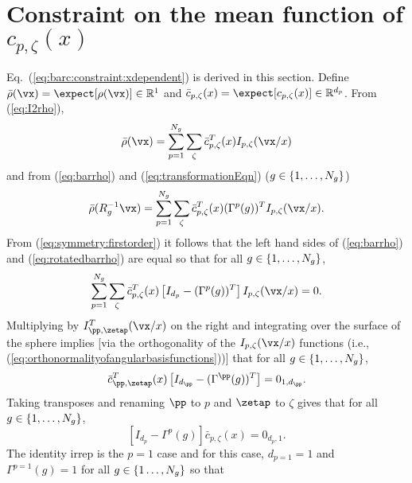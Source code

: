 \section{Constraint on the mean function of $c_{p,\zeta}(x)$}
\label{sec:mean:derivation}
Eq.~(\ref{eq:barc:constraint:xdependent}) is derived in this section.
Define $\bar\rho(\vx)=\expect[\rho(\vx)]\in\mathbb{R}^1$ and
$\bar c_{p,\zeta}(x)=\expect[c_{p,\zeta}(x)]\in\mathbb{R}^{d_p}$.
From (\ref{eq:I2rho}), %
\begin{equation}
\bar\rho(\vx)
=
\sum_{p=1}^{\Ngroup}
\sum_\zeta
\bar c_{p,\zeta}^T(x)
I_{p,\zeta}(\vx/x)
\label{eq:barrho}
\end{equation}
and from
(\ref{eq:barrho}) and (\ref{eq:transformationEqn})
($g\in\{1,\dots,N_g\}$)
\begin{equation}
\bar\rho(R_g^{-1} \vx)
=
\sum_{p=1}^{\Ngroup}
\sum_\zeta
\bar c_{p,\zeta}^T(x)
(\Gamma^p(g))^T
I_{p,\zeta}(\vx/x)
\label{eq:rotatedbarrho}
.
\end{equation}
From (\ref{eq:symmetry:firstorder}) %
it follows that the left hand sides
of
(\ref{eq:barrho}) and (\ref{eq:rotatedbarrho})
are equal so that for
all $g\in\{1,\dots,N_g\}$,
\begin{equation}
\sum_{p=1}^{\Ngroup}
\sum_\zeta
\bar c_{p,\zeta}^T(x)
\left[
I_{d_p}
-
(\Gamma^p(g))^T
\right]
I_{p,\zeta}(\vx/x)
=
0
\label{eq:barc:intermediateresult}
.
\end{equation}
Multiplying by $I_{\pp,\zetap}^T(\vx/x)$ on the right and integrating over the surface of
the sphere implies [via the orthogonality of the $I_{p,\zeta}(\vx/x)$
functions (i.e., (\ref{eq:orthonormalityofangularbasisfunctions}))] %
that
for all $g\in\{1,\dots,N_g\}$,
\begin{equation}
\bar c_{\pp,\zetap}^T(x)
\left[
I_{d_{\pp}}
-
(\Gamma^{\pp}(g))^T
\right]
=
0_{1,d_{\pp}}
.
\end{equation}
Taking transposes and renaming $\pp$ to $p$ and $\zetap$ to $\zeta$ gives
that for all $g\in\{1,\dots,N_g\}$,
\begin{equation}
\left[
I_{d_p}
-
\Gamma^p(g)
\right]
\bar c_{p,\zeta}(x)
=
0_{d_p,1}
\label{eq:barc:xdependent}
.
\end{equation}
The identity irrep is the $p=1$ case and for this case, $d_{p=1}=1$ and
$\Gamma^{p=1}(g)=1$ for all $g\in\{1\dots,N_g\}$ so that
